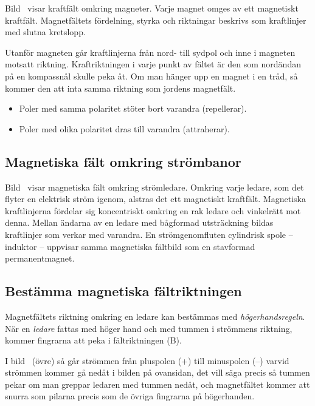 Bild~ visar kraftfält omkring magneter.
Varje magnet omges av ett magnetiskt kraftfält.
Magnetfältets fördelning, styrka och riktningar beskrivs som kraftlinjer med
slutna kretslopp.

Utanför magneten går kraftlinjerna från nord- till sydpol och inne i magneten
motsatt riktning.
Kraftriktningen i varje punkt av fältet är den som nordändan på en kompassnål
skulle peka åt.
Om man hänger upp en magnet i en tråd, så kommer den att inta samma riktning
som jordens magnetfält.

\begin{itemize}
	\item Poler med samma polaritet stöter bort varandra (repellerar).
	\item Poler med olika polaritet dras till varandra (attraherar).
\end{itemize}

\newpage
{}

\subsection{Magnetiska fält omkring strömbanor}
\label{magfält_ström}

Bild~ visar magnetiska fält omkring strömledare.
Omkring varje ledare, som det flyter en elektrisk ström igenom, alstras det ett
magnetiskt kraftfält.
Magnetiska kraftlinjerna fördelar sig koncentriskt omkring en rak ledare och
vinkelrätt mot denna.
Mellan ändarna av en ledare med bågformad utsträckning bildas kraftlinjer som
verkar med varandra.
En strömgenomfluten cylindrisk spole -- induktor -- uppvisar samma magnetiska
fältbild som en stavformad permanentmagnet.

\subsection{Bestämma magnetiska fältriktningen}

Magnetfältets riktning omkring en ledare kan bestämmas med
\emph{högerhandsregeln}.
När en \emph{ledare} fattas med höger hand och med tummen i strömmens
riktning, kommer fingrarna att peka i fältriktningen (B).

I bild~ (övre) så går strömmen från pluspolen (+) till
minuspolen (--) varvid strömmen kommer gå nedåt i bilden på ovansidan,
det vill säga precis så tummen pekar om man greppar ledaren med tummen nedåt,
och magnetfältet kommer att snurra som pilarna precis som de övriga fingrarna
på högerhanden.

